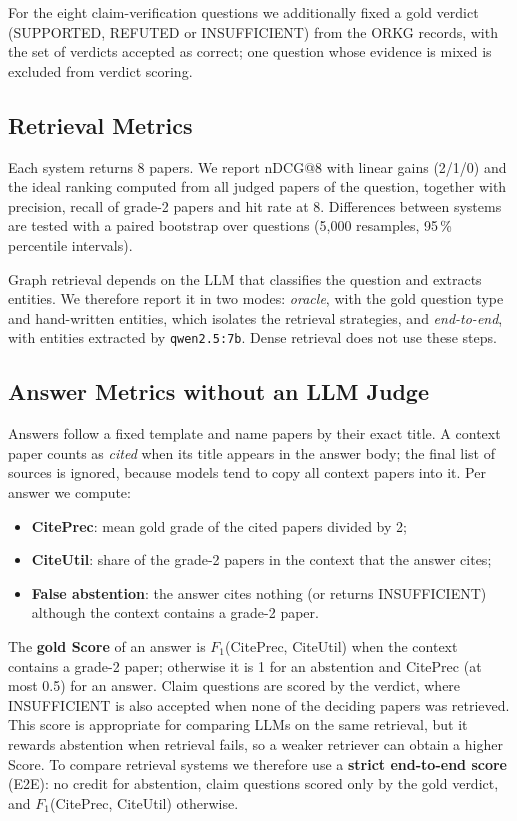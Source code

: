 For the eight claim-verification questions we additionally fixed a gold
verdict (SUPPORTED, REFUTED or INSUFFICIENT) from the ORKG records, with the
set of verdicts accepted as correct; one question whose evidence is mixed is
excluded from verdict scoring.

\subsection{Retrieval Metrics}

Each system returns 8 papers. We report nDCG@8 with linear gains (2/1/0) and the
ideal ranking computed from all judged papers of the question, together with
precision, recall of grade-2 papers and hit rate at 8. Differences between
systems are tested with a paired bootstrap over questions (5,000 resamples,
95\,\% percentile intervals).

Graph retrieval depends on the LLM that classifies the question and extracts
entities. We therefore report it in two modes: \emph{oracle}, with the gold
question type and hand-written entities, which isolates the retrieval
strategies, and \emph{end-to-end}, with entities extracted by \texttt{qwen2.5:7b}.
Dense retrieval does not use these steps.

\subsection{Answer Metrics without an LLM Judge}

Answers follow a fixed template and name papers by their exact title. A context
paper counts as \emph{cited} when its title appears in the answer body; the
final list of sources is ignored, because models tend to copy all context
papers into it. Per answer we compute:

\begin{itemize}
\item \textbf{CitePrec}: mean gold grade of the cited papers divided by 2;
\item \textbf{CiteUtil}: share of the grade-2 papers in the context that the answer cites;
\item \textbf{False abstention}: the answer cites nothing (or returns INSUFFICIENT)
  although the context contains a grade-2 paper.
\end{itemize}

The \textbf{gold Score} of an answer is $F_1$(CitePrec, CiteUtil) when the
context contains a grade-2 paper; otherwise it is 1 for an abstention and
CitePrec (at most 0.5) for an answer. Claim questions are scored by the
verdict, where INSUFFICIENT is also accepted when
none of the deciding papers was retrieved. This score is appropriate for
comparing LLMs on the same retrieval, but it rewards abstention when retrieval
fails, so a weaker retriever can obtain a higher Score. To compare retrieval
systems we therefore use a \textbf{strict end-to-end score} (E2E): no credit for
abstention, claim questions scored only by the gold verdict, and $F_1$(CitePrec,
CiteUtil) otherwise.

